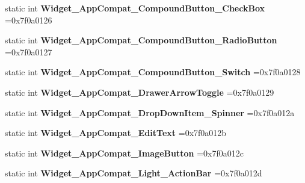 \begin{DoxyCompactItemize}
static int {\bfseries Widget\+\_\+\+App\+Compat\+\_\+\+Compound\+Button\+\_\+\+Check\+Box} =0x7f0a0126
\item 
\mbox{\label{classandroid_1_1support_1_1v7_1_1cardview_1_1R_1_1style_ac6d96d0021bbfb7714cd4ad8940a759d}} 
static int {\bfseries Widget\+\_\+\+App\+Compat\+\_\+\+Compound\+Button\+\_\+\+Radio\+Button} =0x7f0a0127
\item 
\mbox{\label{classandroid_1_1support_1_1v7_1_1cardview_1_1R_1_1style_ac83a116534864c178f0691915dfd6ee2}} 
static int {\bfseries Widget\+\_\+\+App\+Compat\+\_\+\+Compound\+Button\+\_\+\+Switch} =0x7f0a0128
\item 
\mbox{\label{classandroid_1_1support_1_1v7_1_1cardview_1_1R_1_1style_abf9d20e47fe0703fbd9c0b3ef6fd5cb3}} 
static int {\bfseries Widget\+\_\+\+App\+Compat\+\_\+\+Drawer\+Arrow\+Toggle} =0x7f0a0129
\item 
\mbox{\label{classandroid_1_1support_1_1v7_1_1cardview_1_1R_1_1style_aa65d40367c9d63a94af8fc6cbc992b09}} 
static int {\bfseries Widget\+\_\+\+App\+Compat\+\_\+\+Drop\+Down\+Item\+\_\+\+Spinner} =0x7f0a012a
\item 
\mbox{\label{classandroid_1_1support_1_1v7_1_1cardview_1_1R_1_1style_a3514c98c7db2dfc30c6de769870dba1f}} 
static int {\bfseries Widget\+\_\+\+App\+Compat\+\_\+\+Edit\+Text} =0x7f0a012b
\item 
\mbox{\label{classandroid_1_1support_1_1v7_1_1cardview_1_1R_1_1style_a849852918789c794c1b4d35f536007c0}} 
static int {\bfseries Widget\+\_\+\+App\+Compat\+\_\+\+Image\+Button} =0x7f0a012c
\item 
\mbox{\label{classandroid_1_1support_1_1v7_1_1cardview_1_1R_1_1style_a3801f0a829397faa9a3f0d00f4e2f235}} 
static int {\bfseries Widget\+\_\+\+App\+Compat\+\_\+\+Light\+\_\+\+Action\+Bar} =0x7f0a012d
\item 
\mbox{\label{classandroid_1_1support_1_1v7_1_1cardview_1_1R_1_1style_a4e57de97ee0d51a5225cea1f9751caa7}} 

\end{DoxyCompactItemize}
